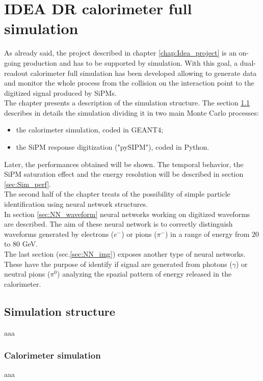\chapter{IDEA DR calorimeter full simulation}
As already said, the project described in chapter \ref{chap:Idea_project} is an on-going production and has to be supported by simulation.
With this goal, a dual-readout calorimeter full simulation has been developed allowing to generate data and monitor the whole process from the collision on the interaction point to the digitized signal produced by SiPMs.\\

The chapter presents a description of the simulation structure. The section \ref{sec:Sim_struc} describes in details the simulation dividing it in two main Monte Carlo processes:
\begin{itemize}
	\item the calorimeter simulation, coded in GEANT4;
	\item the SiPM response digitization ("pySIPM"), coded in Python.
\end{itemize}

Later, the performances obtained will be shown. The temporal behavior, the SiPM saturation effect and the energy resolution will be described in section \ref{sec:Sim_perf}.\\

The second half of the chapter treats of the possibility of simple particle identification using neural network structures.\\
In section \ref{sec:NN_waveform} neural networks working on digitized waveforms are described. The aim of these neural network is to correctly distinguish waveforms generated by electrons ($e^-$) or pions ($\pi^-$) in a range of energy from $20$ to $80$ GeV.\\
The last section (sec.\ref{sec:NN_img})  exposes another type of neural networks. These have the purpose of identify if signal are generated from photons ($\gamma$) or neutral pions ($\pi^0$) analyzing the spazial pattern of energy released in the calorimeter.

\section{Simulation structure} \label{sec:Sim_struc}
aaa

\subsection{Calorimeter simulation} \label{subsec:Sim_cal}
aaa

